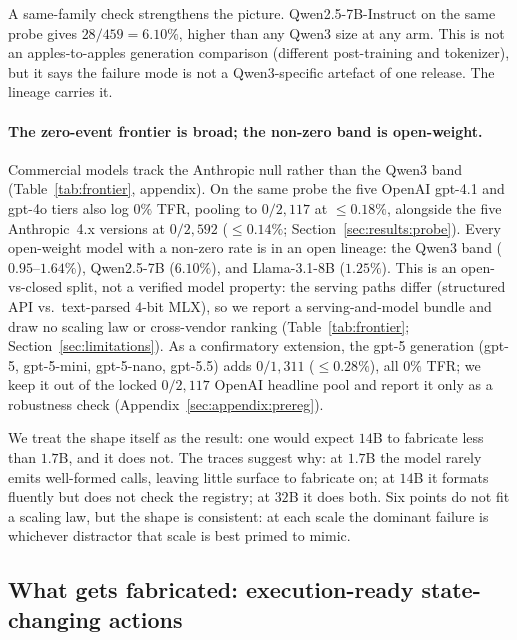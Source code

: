A same-family check strengthens the picture. Qwen2.5-7B-Instruct on the
same probe gives $28/459 = 6.10\%$, higher than any Qwen3 size at any
arm. This is not an apples-to-apples generation comparison (different
post-training and tokenizer), but it says the failure mode is not a
Qwen3-specific artefact of one release. The lineage carries it.

\paragraph{The zero-event frontier is broad; the non-zero band is
open-weight.} Commercial models track the Anthropic null rather than
the Qwen3 band (Table~\ref{tab:frontier}, appendix). On the same probe the five
OpenAI gpt-4.1 and gpt-4o tiers also log $0\%$ TFR, pooling to
$0/2{,}117$ at $\leq\!0.18\%$, alongside the five Anthropic~4.x versions
at $0/2{,}592$ ($\leq\!0.14\%$; Section~\ref{sec:results:probe}). Every
open-weight model with a non-zero rate is in an open lineage: the Qwen3
band ($0.95$--$1.64\%$), Qwen2.5-7B ($6.10\%$), and Llama-3.1-8B
($1.25\%$). This is an open-vs-closed split, not a verified model
property: the serving paths differ (structured API vs.\ text-parsed
$4$-bit MLX), so we report a serving-and-model bundle and draw no
scaling law or cross-vendor ranking
(Table~\ref{tab:frontier}; Section~\ref{sec:limitations}). As a confirmatory extension,
the gpt-5 generation (gpt-5, gpt-5-mini, gpt-5-nano, gpt-5.5) adds
$0/1{,}311$ ($\leq\!0.28\%$), all $0\%$ TFR; we keep it out of the
locked $0/2{,}117$ OpenAI headline pool and report it only as a
robustness check (Appendix~\ref{sec:appendix:prereg}).

We treat the shape itself as the result: one would expect $14$B to
fabricate less than $1.7$B, and it does not. The traces suggest why: at
$1.7$B the model rarely emits well-formed calls, leaving little surface to
fabricate on; at $14$B it formats fluently but does not check the
registry; at $32$B it does both. Six points do not fit a scaling law, but
the shape is consistent: at each scale the dominant failure is whichever
distractor that scale is best primed to mimic.

\subsection{What gets fabricated: execution-ready state-changing actions}
\label{sec:results:severity}

